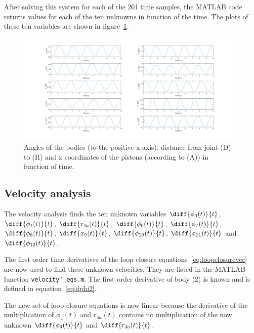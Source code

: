 \documentclass[a4paper]{article}
\begin{document}
After solving this system for each of the 201 time samples, the MATLAB code returns values for each of the ten unknowns in function of the time. The plots of these ten variables are shown in figure~\ref{fig:kinpos}.

\begin{figure}[h]
	\centering
	
	\includegraphics[width = \textwidth]{kinpos.png}
	
	\caption{Angles of the bodies (to the positive x axis), distance from joint (D) to (H) and x coordinates of the pistons (according to (A)) in function of time.}
	\label{fig:kinpos}
	
\end{figure}



\subsection{Velocity analysis}

The velocity analysis finds the ten unknown variables \(\diff{\phi_3(t)}{t}\), \(\diff{\phi_4(t)}{t}\), \(\diff{r_{4a}(t)}{t}\), \(\diff{\phi_6(t)}{t}\), \(\diff{\phi_7(t)}{t}\), \(\diff{\phi_8(t)}{t}\), \(\diff{x_9(t)}{t}\), \(\diff{\phi_{10}(t)}{t}\), \(\diff{x_{11}(t)}{t}\) and \(\diff{\phi_{12}(t)}{t}\).

The first order time derivatives of the loop closure equations~\ref{eq:loopclosurevec} are now used to find these unknown velocities. They are listed in the MATLAB function \texttt{velocity\char`_eqs.m}. The first order derivative of body (2) is known and is defined in equation~\ref{eq:dphi2}. 

The new set of loop closure equations is now linear because the derivative of the multiplication of \(\phi_4(t)\) and \(r_{4a}(t)\) contains no multiplication of the now unknown \(\diff{\phi_4(t)}{t}\) and \(\diff{r_{4a}(t)}{t}\).
\end{document}
